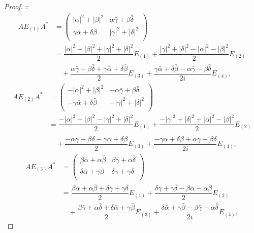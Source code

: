 \documentclass{ctexart}
\begin{document}
\begin{proof}
    $\because$
    \begin{align*}
        AE_{(1)}A^* & =\begin{pmatrix}
            |\alpha|^2+|\beta|^2 & \alpha\bar{\gamma}+\beta\bar{\delta} \\
            \gamma\bar{\alpha}+\delta\bar{\beta} & |\gamma|^2+|\delta|^2 \\
        \end{pmatrix} \\
        & =\dfrac{|\alpha|^2+|\beta|^2+|\gamma|^2+|\delta|^2}{2}E_{(1)}+\dfrac{|\gamma|^2+|\delta|^2-|\alpha|^2-|\beta|^2}{2}E_{(2)} \\
        & \quad+\dfrac{\alpha\bar{\gamma}+\beta\bar{\delta}+\gamma\bar{\alpha}+\delta\bar{\beta}}{2}E_{(3)}+\dfrac{\gamma\bar{\alpha}+\delta\bar{\beta}-\alpha\bar{\gamma}-\beta\bar{\delta}}{2i}E_{(4)},
    \end{align*}
    \begin{align*}
        AE_{(2)}A^* & =\begin{pmatrix}
            -|\alpha|^2+|\beta|^2 & -\alpha\bar{\gamma}+\beta\bar{\delta} \\
            -\gamma\bar{\alpha}+\delta\bar{\beta} & -|\gamma|^2+|\delta|^2 \\
        \end{pmatrix} \\
        & =\dfrac{-|\alpha|^2+|\beta|^2-|\gamma|^2+|\delta|^2}{2}E_{(1)}+\dfrac{-|\gamma|^2+|\delta|^2+|\alpha|^2-|\beta|^2}{2}E_{(2)} \\
        & \quad+\dfrac{-\alpha\bar{\gamma}+\beta\bar{\delta}-\gamma\bar{\alpha}+\delta\bar{\beta}}{2}E_{(3)}+\dfrac{-\gamma\bar{\alpha}+\delta\bar{\beta}+\alpha\bar{\gamma}-\beta\bar{\delta}}{2i}E_{(4)},
    \end{align*}
    \begin{align*}
        AE_{(3)}A^* & =\begin{pmatrix}
            \beta\bar{\alpha}+\alpha\bar{\beta} & \beta\bar{\gamma}+\alpha\bar{\delta} \\
            \delta\bar{\alpha}+\gamma\bar{\beta} & \delta\bar{\gamma}+\gamma\bar{\delta} \\
        \end{pmatrix} \\
        & =\dfrac{\beta\bar{\alpha}+\alpha\bar{\beta}+\delta\bar{\gamma}+\gamma\bar{\delta}}{2}E_{(1)}+\dfrac{\delta\bar{\gamma}+\gamma\bar{\delta}-\beta\bar{\alpha}-\alpha\bar{\beta}}{2}E_{(2)} \\
        & \quad+\dfrac{\beta\bar{\gamma}+\alpha\bar{\delta}+\delta\bar{\alpha}+\gamma\bar{\beta}}{2}E_{(3)}+\dfrac{\delta\bar{\alpha}+\gamma\bar{\beta}-\beta\bar{\gamma}-\alpha\bar{\delta}}{2i}E_{(4)},

\end{align*}
\end{proof}
\end{document}
